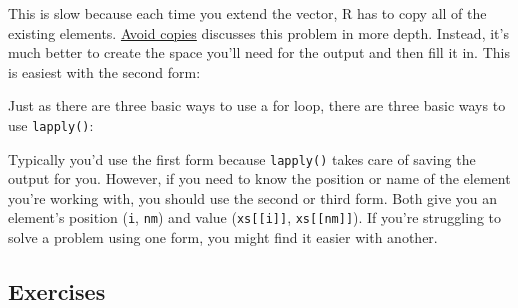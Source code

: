 This is slow because each time you extend the vector, R has to copy all
of the existing elements. \hyperref[avoid-copies]{Avoid copies}
discusses this problem in more depth. Instead, it's much better to
create the space you'll need for the output and then fill it in. This is
easiest with the second form: 

\begin{Shaded}
\begin{Highlighting}[]
\StringTok{ }\NormalTok{(}
  \StringTok{ }
\NormalTok{\}}
\end{Highlighting}
\end{Shaded}

Just as there are three basic ways to use a for loop, there are three
basic ways to use \texttt{lapply()}:

\begin{Shaded}
\begin{Highlighting}[]
\NormalTok{(}
\NormalTok{(}
\end{Highlighting}
\end{Shaded}

Typically you'd use the first form because \texttt{lapply()} takes care
of saving the output for you. However, if you need to know the position
or name of the element you're working with, you should use the second or
third form. Both give you an element's position (\texttt{i},
\texttt{nm}) and value (\texttt{xs{[}{[}i{]}{]}},
\texttt{xs{[}{[}nm{]}{]}}). If you're struggling to solve a problem
using one form, you might find it easier with another.

\subsection{Exercises}

